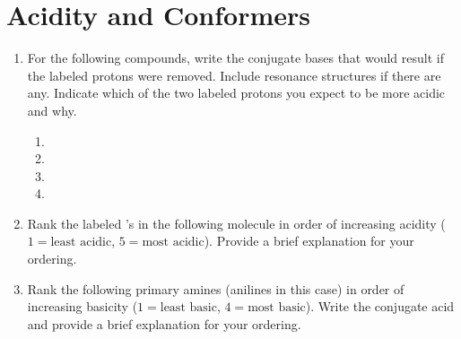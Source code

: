 \documentclass[../psets.tex]{subfiles}
\begin{document}
\section{Acidity and Conformers}
\begin{enumerate}
    \item {}For the following compounds, write the conjugate bases that would result if the labeled protons were removed. Include resonance structures if there are any. Indicate which of the two labeled protons you expect to be more acidic and why.
    \begin{enumerate}[itemsep=1.5em]
        \item {\footnotesize{}}
        \item {\footnotesize{}}
        \item {\footnotesize{}}
        \item {\footnotesize{}}
    \end{enumerate}
    \item Rank the labeled 's in the following molecule in order of increasing acidity ($1=\text{least acidic}$, $5=\text{most acidic}$). Provide a brief explanation for your ordering.
    \begin{center}
        \footnotesize
    \end{center}
    \item Rank the following primary amines (anilines in this case) in order of increasing basicity ($1=\text{least basic}$, $4=\text{most basic}$). Write the conjugate acid and provide a brief explanation for your ordering.
    \begin{figure}[h!]
        \centering
        \footnotesize
        \begin{subfigure}[b]{0.2\linewidth}
            \centering

\end{subfigure}
\end{figure}
\end{enumerate}
\end{document}
